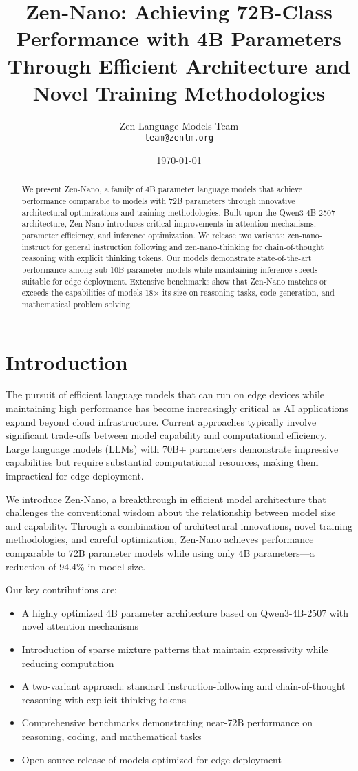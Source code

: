 \documentclass[11pt,a4paper]{article}
\title{Zen-Nano: Achieving 72B-Class Performance with 4B Parameters Through Efficient Architecture and Novel Training Methodologies}
\author{
Zen Language Models Team\\
\texttt{team@zenlm.org}
}
\date{\today}
\begin{document}
\maketitle

\begin{abstract}
We present Zen-Nano, a family of 4B parameter language models that achieve performance comparable to models with 72B parameters through innovative architectural optimizations and training methodologies. Built upon the Qwen3-4B-2507 architecture, Zen-Nano introduces critical improvements in attention mechanisms, parameter efficiency, and inference optimization. We release two variants: zen-nano-instruct for general instruction following and zen-nano-thinking for chain-of-thought reasoning with explicit thinking tokens. Our models demonstrate state-of-the-art performance among sub-10B parameter models while maintaining inference speeds suitable for edge deployment. Extensive benchmarks show that Zen-Nano matches or exceeds the capabilities of models 18× its size on reasoning tasks, code generation, and mathematical problem solving.
\end{abstract}

\section{Introduction}

The pursuit of efficient language models that can run on edge devices while maintaining high performance has become increasingly critical as AI applications expand beyond cloud infrastructure. Current approaches typically involve significant trade-offs between model capability and computational efficiency. Large language models (LLMs) with 70B+ parameters demonstrate impressive capabilities but require substantial computational resources, making them impractical for edge deployment.

We introduce Zen-Nano, a breakthrough in efficient model architecture that challenges the conventional wisdom about the relationship between model size and capability. Through a combination of architectural innovations, novel training methodologies, and careful optimization, Zen-Nano achieves performance comparable to 72B parameter models while using only 4B parameters—a reduction of 94.4\% in model size.

Our key contributions are:
\begin{itemize}
    \item A highly optimized 4B parameter architecture based on Qwen3-4B-2507 with novel attention mechanisms
    \item Introduction of sparse mixture patterns that maintain expressivity while reducing computation
    \item A two-variant approach: standard instruction-following and chain-of-thought reasoning with explicit thinking tokens
    \item Comprehensive benchmarks demonstrating near-72B performance on reasoning, coding, and mathematical tasks
    \item Open-source release of models optimized for edge deployment
\end{itemize}
\end{document}
